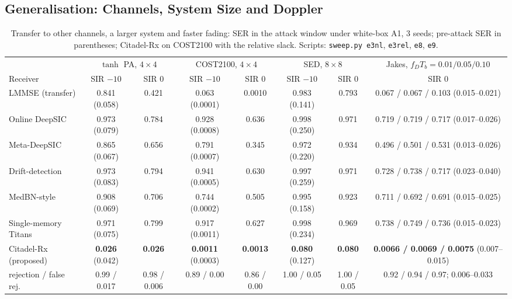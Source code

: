 \documentclass[journal]{IEEEtran}
\begin{document}
\subsection{Generalisation: Channels, System Size and Doppler}\label{sec:gen}
\begin{table}[t]
\centering\caption{Transfer to other channels, a larger system and faster fading: SER in
the attack window under white-box A1, 3 seeds; pre-attack SER in parentheses; Citadel-Rx
on COST2100 with the relative slack. Scripts: \texttt{sweep.py e3nl}, \texttt{e3rel},
\texttt{e8}, \texttt{e9}.}\label{tab:gen}
\scriptsize
\begin{tabular}{@{}lccccccc@{}}
\toprule
 & \multicolumn{2}{c}{$\tanh$ PA, $4\times4$} & \multicolumn{2}{c}{COST2100, $4\times4$} & \multicolumn{2}{c}{SED, $8\times8$} & Jakes, $f_DT_b=0.01/0.05/0.10$\\
\cmidrule(lr){2-3}\cmidrule(lr){4-5}\cmidrule(lr){6-7}\cmidrule(lr){8-8}
Receiver & SIR $-10$ & SIR $0$ & SIR $-10$ & SIR $0$ & SIR $-10$ & SIR $0$ & SIR $0$\\
\midrule
LMMSE (transfer) & 0.841 (0.058) & 0.421 & 0.063 (0.0001) & 0.0010 & 0.983 (0.141) & 0.793 & 0.067 / 0.067 / 0.103 (0.015--0.021)\\
Online DeepSIC & 0.973 (0.079) & 0.784 & 0.928 (0.0008) & 0.636 & 0.998 (0.250) & 0.971 & 0.719 / 0.719 / 0.717 (0.017--0.026)\\
Meta-DeepSIC & 0.865 (0.067) & 0.656 & 0.791 (0.0007) & 0.345 & 0.972 (0.220) & 0.934 & 0.496 / 0.501 / 0.531 (0.013--0.026)\\
Drift-detection & 0.973 (0.083) & 0.794 & 0.941 (0.0005) & 0.630 & 0.997 (0.259) & 0.971 & 0.728 / 0.738 / 0.717 (0.023--0.040)\\
MedBN-style & 0.908 (0.069) & 0.706 & 0.744 (0.0002) & 0.505 & 0.995 (0.158) & 0.923 & 0.711 / 0.692 / 0.691 (0.015--0.025)\\
Single-memory Titans & 0.971 (0.075) & 0.799 & 0.917 (0.0011) & 0.627 & 0.998 (0.234) & 0.969 & 0.738 / 0.749 / 0.736 (0.015--0.023)\\
Citadel-Rx (proposed) & \textbf{0.026} (0.042) & \textbf{0.026} & \textbf{0.0011} (0.0003) & \textbf{0.0013} & \textbf{0.080} (0.127) & \textbf{0.080} & \textbf{0.0066 / 0.0069 / 0.0075} (0.007--0.015)\\
\quad rejection / false rej. & 0.99 / 0.017 & 0.98 / 0.006 & 0.89 / 0.00 & 0.86 / 0.00 & 1.00 / 0.05 & 1.00 / 0.05 & 0.92 / 0.94 / 0.97; 0.006--0.033\\
\bottomrule
\end{tabular}
\end{table}
\end{document}
